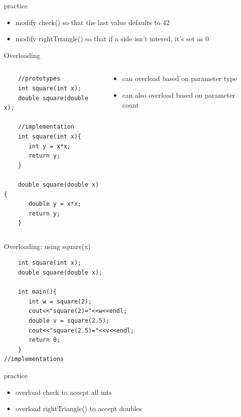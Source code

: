 \documentclass[xcolor={dvipsnames}]{beamer}
\begin{document}
\begin{frame}{practice}
	\begin{itemize}
		\item modify check() so that the last value defaults to 42
		\item modify rightTriangle() so that if a side isn't intered, it's set as 0
	\end{itemize}
\end{frame}

\begin{frame}[fragile]{Overloading}

	\begin{columns}
	\begin{column}{.49\textwidth}
	\begin{verbatim}
	//prototypes
	int square(int x);
	double square(double x);
	
	//implementation
	int square(int x){
	   int y = x*x;
	   return y;
	}
   
	double square(double x){
	   double y = x*x;
	   return y;
	}   
	\end{verbatim}
	\end{column}
	\begin{column}{.49\textwidth}
	\begin{itemize}
		\item can overload based on parameter type
		\item can also overload based on parameter count
	\end{itemize}
	\end{column}
	\end{columns}
\end{frame}


\begin{frame}[fragile]{Overloading: using square(x)}
	\begin{verbatim}
	int square(int x);
	double square(double x);

	int main(){
	   int w = square(2);
	   cout<<"square(2)="<<w<<endl;
	   double v = square(2.5);
	   cout<<"square(2.5)="<<v<<endl;
	   return 0;
	}
//implementations
\end{verbatim}
\end{frame}

\begin{frame}{practice}
	\begin{itemize}
		\item overload check to accept all ints
		\item overload rightTriangle() to accept doubles
	\end{itemize}
\end{frame}
\end{document}
